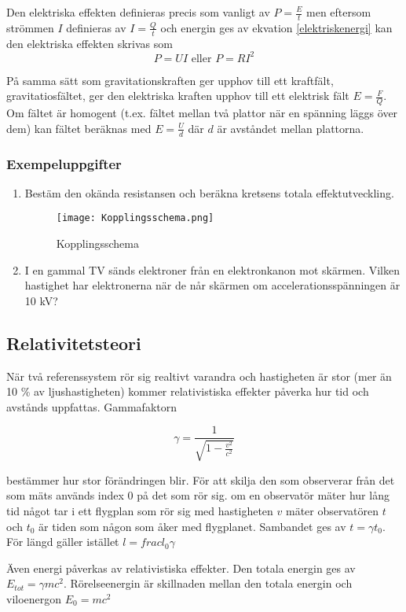 \documentclass[10pt, titlepage, oneside, a4paper]{article}
\newcommand{\Subsection}[1]{\vspace{-4pt}\subsection{#1}\vspace{-8pt}}
\newcommand{\Subsubsection}[1]{\vspace{-4pt}\subsubsection{#1}\vspace{-8pt}}
\begin{document}
    Den elektriska effekten definieras precis som vanligt av $ P  = \frac{E}{t}$ men eftersom strömmen $I$ definieras av
    $I = \frac{Q}{t}$ och energin ges av ekvation \ref{elektriskenergi} kan den elektriska effekten skrivas som
    \begin{equation}
        P = U I \text{ eller } P = R I^2
    \end{equation}

    På samma sätt som gravitationskraften ger upphov till ett kraftfält, gravitatiosfältet, ger den elektriska kraften
    upphov till ett elektrisk fält $E = \frac{F}{Q}$. Om fältet är homogent (t.ex. fältet mellan två plattor när en spänning
    läggs över dem) kan fältet beräknas med $E = \frac{U}{d}$ där $d$ är avståndet mellan plattorna.
    \newpage
    \Subsubsection{Exempeluppgifter}
    \begin{enumerate}
        \item Bestäm den okända resistansen och beräkna kretsens totala effektutveckling.
        \begin{figure}[h]
            \texttt{[image: Kopplingsschema.png]}
            \caption{Kopplingsschema}
        \end{figure}
        \item I en gammal TV sänds elektroner från en
        elektronkanon mot skärmen. Vilken hastighet har
        elektronerna när de når skärmen om
        accelerationsspänningen är 10 kV?
    \end{enumerate}

    \newpage
    \Subsection{Relativitetsteori}
    När två referenssystem rör sig realtivt varandra och hastigheten är stor (mer än 10 \% av ljushastigheten) kommer
    relativistiska effekter påverka hur tid och avstånds uppfattas. Gammafaktorn

    \begin{equation}
         \gamma = \frac{1}{\sqrt{1-\frac{v^2}{c^2}}}
    \end{equation}

    bestämmer hur stor förändringen blir. För att skilja den som observerar från det som mäts används index 0 på det som rör sig.
    om en observatör mäter hur lång tid något tar i ett flygplan som rör sig med hastigheten $v$ mäter observatören $t$ och $t_0$
    är tiden som någon som åker med flygplanet. Sambandet ges av $t = \gamma t_0$. För längd gäller istället $l = frac{l_{0}}{\gamma}$

    Även energi påverkas av relativistiska effekter. Den totala energin ges av $E_{tot} = \gamma m c^2$. Rörelseenergin är skillnaden mellan
    den totala energin och viloenergon $E_0 = mc^2$
\end{document}
